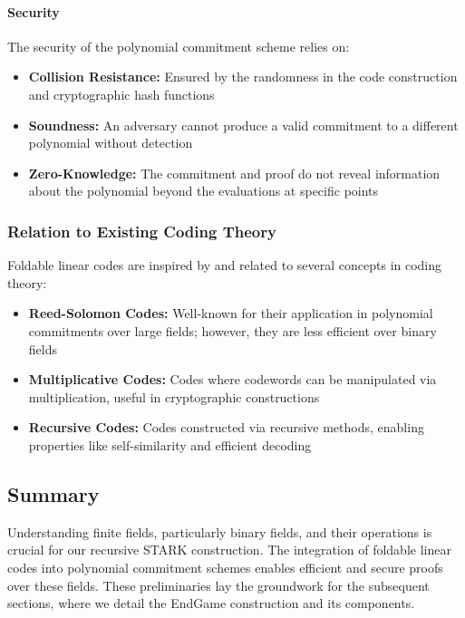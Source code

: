 \documentclass{article}
\theoremstyle{plain}
\theoremstyle{definition}
\theoremstyle{remark}
\theoremstyle{problem}
\begin{document}
\paragraph{Security}

The security of the polynomial commitment scheme relies on:
\begin{itemize}
    \item \textbf{Collision Resistance:} Ensured by the randomness in the code construction and cryptographic hash functions
    \item \textbf{Soundness:} An adversary cannot produce a valid commitment to a different polynomial without detection
    \item \textbf{Zero-Knowledge:} The commitment and proof do not reveal information about the polynomial beyond the evaluations at specific points
\end{itemize}

\subsubsection{Relation to Existing Coding Theory}

Foldable linear codes are inspired by and related to several concepts in coding theory:
\begin{itemize}
    \item \textbf{Reed-Solomon Codes:} Well-known for their application in polynomial commitments over large fields; however, they are less efficient over binary fields
    \item \textbf{Multiplicative Codes:} Codes where codewords can be manipulated via multiplication, useful in cryptographic constructions
    \item \textbf{Recursive Codes:} Codes constructed via recursive methods, enabling properties like self-similarity and efficient decoding
\end{itemize}

\subsection{Summary}

Understanding finite fields, particularly binary fields, and their operations is crucial for our recursive STARK construction. The integration of foldable linear codes into polynomial commitment schemes enables efficient and secure proofs over these fields. These preliminaries lay the groundwork for the subsequent sections, where we detail the EndGame construction and its components.
\end{document}
